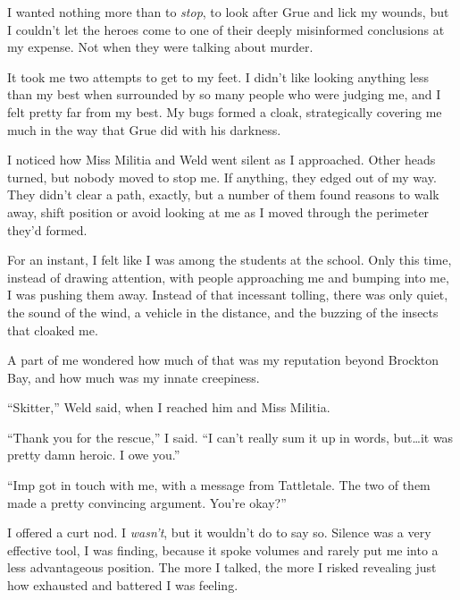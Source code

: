 





I wanted nothing more than to \emph{stop}, to look after Grue and lick my wounds, but I couldn't let the heroes come to one of their deeply misinformed conclusions at my expense.  Not when they were talking about murder.



It took me two attempts to get to my feet.  I didn't like looking anything less than my best when surrounded by so many people who were judging me, and I felt pretty far from my best.  My bugs formed a cloak, strategically covering me much in the way that Grue did with his darkness.



I noticed how Miss Militia and Weld went silent as I approached.  Other heads turned, but nobody moved to stop me.  If anything, they edged out of my way.  They didn't clear a path, exactly, but a number of them found reasons to walk away, shift position or avoid looking at me as I moved through the perimeter they'd formed.



For an instant, I felt like I was among the students at the school.  Only this time, instead of drawing attention, with people approaching me and bumping into me, I was pushing them away.  Instead of that incessant tolling, there was only quiet, the sound of the wind, a vehicle in the distance, and the buzzing of the insects that cloaked me.



A part of me wondered how much of that was my reputation beyond Brockton Bay, and how much was my innate creepiness.



``Skitter,'' Weld said, when I reached him and Miss Militia.



``Thank you for the rescue,'' I said.  ``I can't really sum it up in words, but\ldots it was pretty damn heroic.  I owe you.''



``Imp got in touch with me, with a message from Tattletale.  The two of them made a pretty convincing argument.  You're okay?''



I offered a curt nod.  I \emph{wasn't}, but it wouldn't do to say so.  Silence was a very effective tool, I was finding, because it spoke volumes and rarely put me into a less advantageous position.  The more I talked, the more I risked revealing just how exhausted and battered I was feeling.




